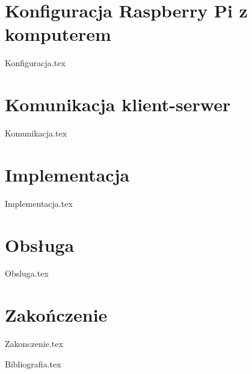 \documentclass[12pt,a4paper,leqno,oneside,titlepage]{mwrep}
\begin{document}
\chapter{Konfiguracja Raspberry Pi z komputerem}
{Konfiguracja.tex}

\chapter{Komunikacja klient-serwer}
{Komunikacja.tex}

\chapter{Implementacja}
{Implementacja.tex}

\chapter{Obsługa}
{Obsluga.tex}

\chapter{Zakończenie}
{Zakonczenie.tex}

{Bibliografia.tex}
\end{document}
